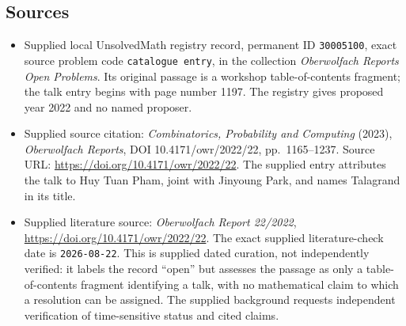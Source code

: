 \documentclass[11pt]{article}
\begin{document}
\subsection{Sources}
\begin{itemize}
\item Supplied local UnsolvedMath registry record, permanent ID \texttt{30005100}, exact source problem code \texttt{catalogue entry}, in the collection \emph{Oberwolfach Reports Open Problems}. Its original passage is a workshop table-of-contents fragment; the talk entry begins with page number 1197. The registry gives proposed year 2022 and no named proposer.
\item Supplied source citation: \emph{Combinatorics, Probability and Computing} (2023), \emph{Oberwolfach Reports}, DOI 10.4171/owr/2022/22, pp.~1165--1237. Source URL: \url{https://doi.org/10.4171/owr/2022/22}. The supplied entry attributes the talk to Huy Tuan Pham, joint with Jinyoung Park, and names Talagrand in its title.
\item Supplied literature source: \emph{Oberwolfach Report 22/2022}, \url{https://doi.org/10.4171/owr/2022/22}. The exact supplied literature-check date is \texttt{2026-08-22}. This is supplied dated curation, not independently verified: it labels the record ``open'' but assesses the passage as only a table-of-contents fragment identifying a talk, with no mathematical claim to which a resolution can be assigned. The supplied background requests independent verification of time-sensitive status and cited claims.
\end{itemize}
\end{document}
